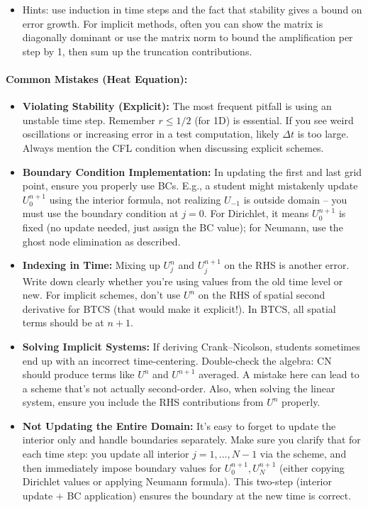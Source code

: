 \documentclass[a4paper,11pt]{article}
\begin{document}
\begin{enumerate}
\begin{itemize}
              \item Hints: use induction in time steps and the fact that stability gives a bound on error growth. For implicit methods, often you can show the matrix is diagonally dominant or use the matrix norm to bound the amplification per step by 1, then sum up the truncation contributions.
          \end{itemize}
\end{enumerate}

\paragraph{Common Mistakes (Heat Equation):}
\begin{itemize}
    \item \textbf{Violating Stability (Explicit):} The most frequent pitfall is using an unstable time step. Remember $r \le 1/2$ (for 1D) is essential. If you see weird oscillations or increasing error in a test computation, likely $\Delta t$ is too large. Always mention the CFL condition when discussing explicit schemes.

    \item \textbf{Boundary Condition Implementation:} In updating the first and last grid point, ensure you properly use BCs. E.g., a student might mistakenly update $U_0^{n+1}$ using the interior formula, not realizing $U_{-1}$ is outside domain -- you must use the boundary condition at $j=0$. For Dirichlet, it means $U_0^{n+1}$ is fixed (no update needed, just assign the BC value); for Neumann, use the ghost node elimination as described.

    \item \textbf{Indexing in Time:} Mixing up $U_j^{n}$ and $U_j^{n+1}$ on the RHS is another error. Write down clearly whether you're using values from the old time level or new. For implicit schemes, don't use $U^n$ on the RHS of spatial second derivative for BTCS (that would make it explicit!). In BTCS, all spatial terms should be at $n+1$.

    \item \textbf{Solving Implicit Systems:} If deriving Crank--Nicolson, students sometimes end up with an incorrect time-centering. Double-check the algebra: CN should produce terms like $U^n$ and $U^{n+1}$ averaged. A mistake here can lead to a scheme that's not actually second-order. Also, when solving the linear system, ensure you include the RHS contributions from $U^n$ properly.

    \item \textbf{Not Updating the Entire Domain:} It's easy to forget to update the interior only and handle boundaries separately. Make sure you clarify that for each time step: you update all interior $j=1,\ldots,N-1$ via the scheme, and then immediately impose boundary values for $U_0^{n+1},U_N^{n+1}$ (either copying Dirichlet values or applying Neumann formula). This two-step (interior update + BC application) ensures the boundary at the new time is correct.
\end{itemize}
\end{document}
